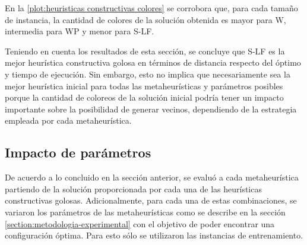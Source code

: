 En la \cref{plot:heuristicas constructivas colores} se corrobora que, para cada tamaño de instancia, la cantidad de colores de la solución obtenida es mayor para W, intermedia para WP y menor para S-LF.

Teniendo en cuenta los resultados de esta sección, se concluye que S-LF es la mejor heurística constructiva golosa en términos de distancia respecto del óptimo y tiempo de ejecución. Sin embargo, esto no implica que necesariamente sea la mejor heurística inicial para todas las metaheurísticas y parámetros posibles porque la cantidad de coloreos de la solución inicial podría tener un impacto importante sobre la posibilidad de generar vecinos, dependiendo de la estrategia empleada por cada metaheurística.

\subsection{Impacto de parámetros}

De acuerdo a lo concluido en la sección anterior, se evaluó a cada metaheurística partiendo de la solución proporcionada por cada una de las heurísticas constructivas golosas. Adicionalmente, para cada una de estas combinaciones, se variaron los parámetros de las metaheurísticas como se describe en la sección \ref{section:metodologia-experimental} con el objetivo de poder encontrar una configuración óptima. Para esto sólo se utilizaron las instancias de entrenamiento.

